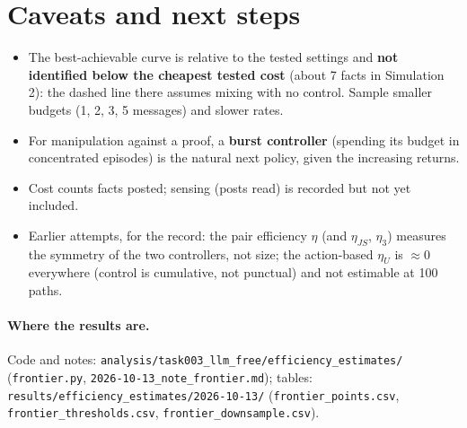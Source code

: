 \documentclass[10pt,a4paper]{article}
\begin{document}
\section{Caveats and next steps}

\begin{itemize}\itemsep1pt
\item The best-achievable curve is relative to the tested settings and \textbf{not identified below the
  cheapest tested cost} (about 7 facts in Simulation 2): the dashed line there assumes mixing with no control. Sample
  smaller budgets (1, 2, 3, 5 messages) and slower rates.
\item For manipulation against a proof, a \textbf{burst controller} (spending its budget in concentrated
  episodes) is the natural next policy, given the increasing returns.
\item Cost counts facts posted; sensing (posts read) is recorded but not yet included.
\item Earlier attempts, for the record: the pair efficiency $\eta$ (and $\eta_{JS}$, $\eta_3$) measures the
  symmetry of the two controllers, not size; the action-based $\eta_U$ is $\approx 0$ everywhere (control is
  cumulative, not punctual) and not estimable at 100 paths.
\end{itemize}

\paragraph{Where the results are.} Code and notes:
\texttt{analysis/task003\_llm\_free/efficiency\_estimates/} (\texttt{frontier.py},
\texttt{2026-10-13\_note\_frontier.md}); tables: \texttt{results/efficiency\_estimates/2026-10-13/}
(\texttt{frontier\_points.csv}, \texttt{frontier\_thresholds.csv}, \texttt{frontier\_downsample.csv}).
\end{document}
